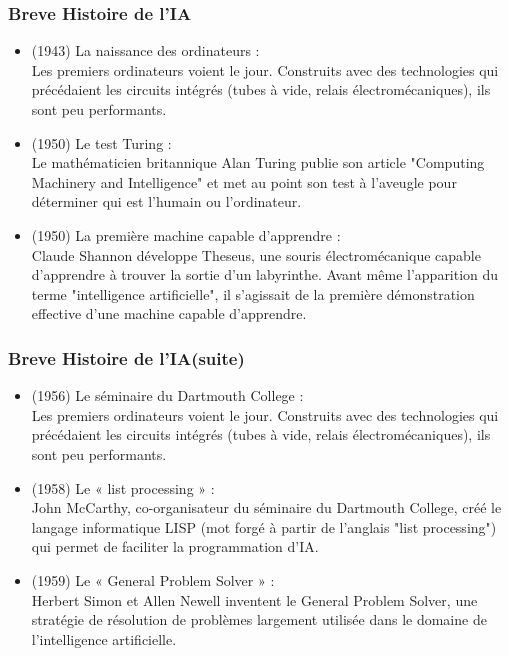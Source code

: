 \documentclass{beamer}
\begin{document}
	\begin{frame}[fragile]
	\frametitle{Breve Histoire de l'IA}
	\begin{itemize}
		\itemsep0.5em
		\item (1943) La naissance des ordinateurs :\\
		 Les premiers ordinateurs voient le jour. Construits avec des technologies qui précédaient les circuits 			intégrés (tubes à vide, relais électromécaniques), ils sont peu performants.
		 
		 \item (1950) Le test Turing : \\
		 Le mathématicien britannique Alan Turing publie son article "Computing Machinery and Intelligence" 			 et met au point son test à l’aveugle pour déterminer qui est l’humain ou l’ordinateur.

		 \item (1950) La première machine capable d’apprendre :\\
		 Claude Shannon développe Theseus, une souris électromécanique capable d’apprendre à trouver la 			 sortie d’un labyrinthe. Avant même l’apparition du terme "intelligence artificielle", il s’agissait de la 				 première démonstration effective d’une machine capable d’apprendre.

	\end{itemize}
	\end{frame}
	
	\begin{frame}[fragile]
	\frametitle{Breve Histoire de l'IA(suite)}
	\begin{itemize}
		\itemsep1em
		\item (1956) Le séminaire du Dartmouth College :\\
		 Les premiers ordinateurs voient le jour. Construits avec des technologies qui précédaient les circuits 			intégrés (tubes à vide, relais électromécaniques), ils sont peu performants.
		 
		 \item (1958) Le « list processing » : \\
		 John McCarthy, co-organisateur du séminaire du Dartmouth College, créé le langage informatique 				 LISP (mot forgé à partir de l’anglais "list processing") qui permet de faciliter la programmation d’IA.

		 \item (1959) Le « General Problem Solver » :\\
		 Herbert Simon et Allen Newell inventent le General Problem Solver, une stratégie de résolution de 				 problèmes largement utilisée dans le domaine de l'intelligence artificielle.

	\end{itemize}
	\end{frame}
	
\end{document}
